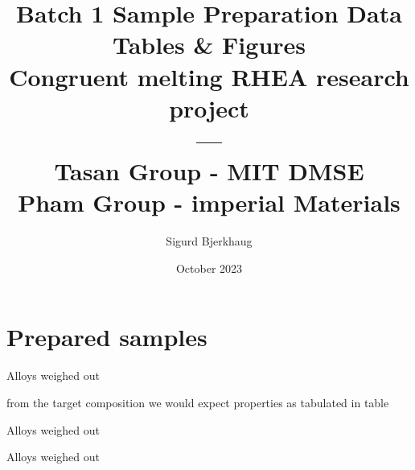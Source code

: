\documentclass[a4]{article}
\title{Batch 1 Sample Preparation Data Tables \& Figures \\ Congruent melting RHEA research project \\ ---\\Tasan Group - MIT DMSE \\ Pham Group - imperial Materials \\}
\author{Sigurd Bjerkhaug}
\date{October 2023}
\begin{document}
\maketitle

\newpage




\section{Prepared samples}

\begin{table}[h]
    \centering
    \caption{Alloys weighed out}
    
    \label{tab:Batch1 mesured}
\end{table}

from the target composition we would expect properties as tabulated in table
\begin{table}[h]
    \centering
    \caption{Alloys weighed out}
    
    \label{tab:Batch1 mesured}
\end{table}


\begin{table}[h]
    \centering
    \caption{Alloys weighed out}
    
    \label{tab:Batch1 mesured}
\end{table}
\end{document}
